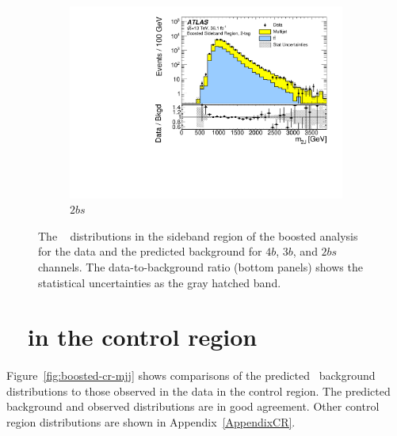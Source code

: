 \begin{figure}[htb!]
    \\
    \begin{subfigure}[b]{0.35\textwidth}
        \includegraphics[width=\textwidth,angle=-90]{figures/boosted/Paperplot/Moriond_bkg_9_TwoTag_split_Sideband_mHH_l_1.pdf}
        \caption{$2bs$}
        \label{fig:boosted-sb-mjj-2bs}
    \end{subfigure}
   \caption{The \mtwoJ~ distributions in the sideband region of the boosted analysis for the data and the predicted background for $4b$, $3b$, and $2bs$ channels. The data-to-background ratio (bottom panels) shows the statistical uncertainties as the gray hatched band.}
  \label{fig:boosted-sb-mjj}
\end{figure}


\clearpage
\section{\mtwoJ~ in the control region}
\label{sec:boosted-cr}

\paragraph{}
Figure~\ref{fig:boosted-cr-mjj} shows comparisons of the predicted \mtwoJ~background distributions to those observed in the data in the control region.
The predicted background and observed distributions are in good agreement.
Other control region distributions are shown in Appendix~\ref{AppendixCR}.

